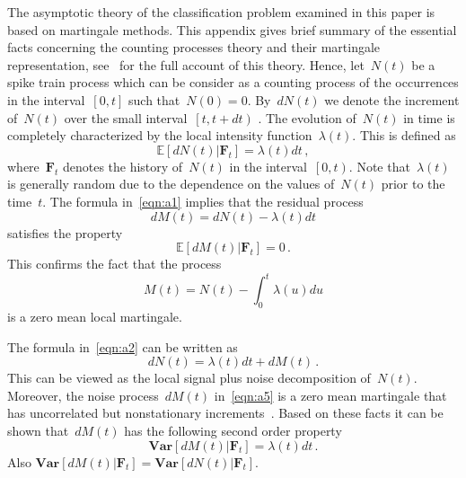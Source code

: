 \documentclass[lettersize,journal,onecolumn]{IEEEtran}
\theoremstyle{definition}
\newcommand{\E}[1]{\mathbb{E}\left[#1\right]}
\newcommand{\Var}[1]{\mathbf{Var}\left[#1\right]}
\begin{document}
The asymptotic theory of the classification problem examined in this paper is based on 
martingale methods. This appendix gives brief summary of the essential facts 
concerning the counting processes theory and their martingale representation, 
see~\cite{andersen2012statistical} for the full account of this theory. Hence, 
let~$N(t)$ be a spike train process which can be consider as a counting process of the 
occurrences in the interval~$\left[0,t\right]$ such that~$N(0)=0$. By~$dN(t)$ we 
denote the increment of~$N(t)$ over the small interval~$\left[t,t+dt\right)$ . The 
evolution of~$N(t)$ in time is completely characterized by the local intensity 
function~$\lambda(t)$. This is defined as
\begin{equation}
	\E{dN(t)|\mathbf{F}_t} = \lambda(t)dt
	\label{eqn:a1} \,,
\end{equation}
where~$\mathbf{F}_t$ denotes the history of~$N(t)$ in the interval~$\left[0,t\right)$. 
Note that~$\lambda(t)$ is generally random due to the dependence on the values 
of~$N(t)$ prior to the time~$t$. The formula in~\eqref{eqn:a1} implies that the 
residual process
\begin{equation}
	dM(t) = dN(t) - \lambda(t)dt
	\label{eqn:a2}
\end{equation}
satisfies the property
\begin{equation}
	\E{dM(t)|\mathbf{F}_t} = 0
	\label{eqn:a3} \,.
\end{equation}
This confirms the fact that the process
\begin{equation}
	M(t) = N(t) - \int_{0}^{t} \lambda(u) du
	\label{eqn:a4}
\end{equation}
is a zero mean local martingale.

The formula in~\eqref{eqn:a2} can be written as
\begin{equation}
	dN(t) = \lambda(t)dt + dM(t)
	\label{eqn:a5} \,.
\end{equation}
This can be viewed as the local signal plus noise decomposition of~$N(t)$. Moreover, 
the noise process~$dM(t)$ in~\eqref{eqn:a5} is a zero mean martingale that has 
uncorrelated but nonstationary increments~\cite{andersen2012statistical}. Based on 
these facts it can be shown that~$dM(t)$ has the following second order property
\begin{equation}
	\Var{dM(t)|\mathbf{F}_t} = \lambda(t)dt
	\label{eqn:a6} \,.
\end{equation}
Also \mbox{$\Var{dM(t)|\mathbf{F}_t}=\Var{dN(t)|\mathbf{F}_t}$}.
\end{document}
